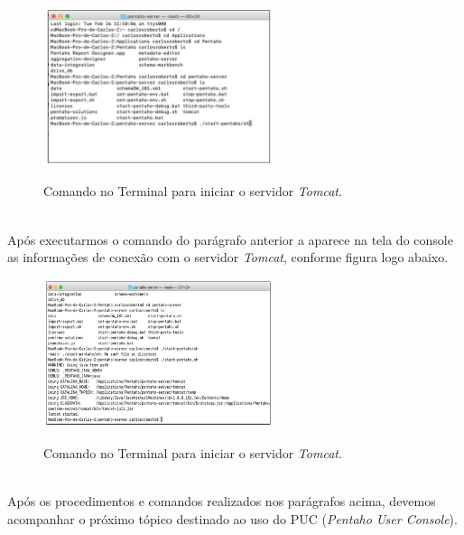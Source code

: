 \begin{figure}[H]
	\vspace*{0,2cm}
    \centering
    \caption{Comando no Terminal para iniciar o servidor \textit{Tomcat}.}
    \includegraphics[width=0.6\textwidth]{./04-figuras/figura-pserver}
    \label{fig:ilustfigpserver}
\end{figure}
\vspace*{-0,9cm}
{\raggedright {}} \\

Ap\'os executarmos o comando do par\'{a}grafo anterior a aparece na tela do console as informa\c{c}\~{o}es de conex\~{a}o com o servidor \textit{Tomcat}, conforme figura logo abaixo.

\begin{figure}[H]
	\vspace*{0,2cm}
    \centering
    \caption{Comando no Terminal para iniciar o servidor \textit{Tomcat}.}
    \includegraphics[width=0.6\textwidth]{./04-figuras/figura-pserver-iniciando}
    \label{fig:ilustfigpserveriniciando}
\end{figure}
\vspace*{-0,9cm}
{\raggedright {}} \\

Ap\'os os procedimentos e comandos realizados nos par\'{a}grafos acima, devemos acompanhar o pr\'oximo t\'opico destinado ao uso do PUC (\textit{Pentaho User Console}).

